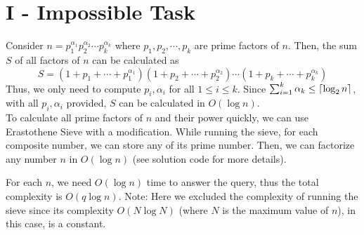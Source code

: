 \documentclass{article}
\DeclarePairedDelimiter\ceil{\lceil}{\rceil}
\begin{document}
\section*{I - Impossible Task}
Consider $n = p_1^{\alpha_1}p_2^{\alpha_2}\cdots p_k^{\alpha_k}$ where $p_1, p_2, \cdots, p_k$ are prime factors of $n$.
Then, the sum $S$ of all factors of $n$ can be calculated as
\begin{equation}
S = \left(1 + p_1 + \cdots + p_1^{\alpha_1}\right)\left(1 + p_2 + \cdots + p_2^{\alpha_2}\right)\cdots\left(1 + p_k + \cdots + p_k^{\alpha_k}\right)
\end{equation}
Thus, we only need to compute $p_i, \alpha_i$ for all $1 \leq i \leq k$. Since $\sum_{i = 1}^k \alpha_k \leq \ceil{\log_2{n}}$, with
all $p_i, \alpha_i$ provided, $S$ can be calculated in $O(\log{n})$.\\

\noindent To calculate all prime factors of $n$ and their power quickly, we can use Erastothene Sieve with a modification. While
running the sieve, for each composite number, we can store any of its prime number. Then, we can factorize any number $n$ in
$O(\log{n})$ (see solution code for more details).

For each $n$, we need $O(\log{n})$ time to answer the query, thus the total complexity is $O(q\log{n})$. Note: Here we excluded
the complexity of running the sieve since its complexity $O(N\log{N})$ (where $N$ is the maximum value of $n$), in this case, is
a constant.
\end{document}
